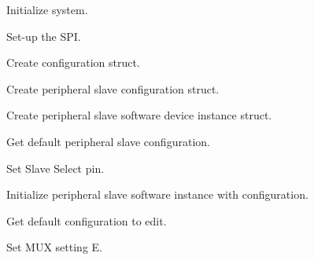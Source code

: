 \begin{DoxyEnumerate}
\item Initialize system. 
\begin{DoxyCodeInclude}{0}
\end{DoxyCodeInclude}

\item Set-\/up the S\+PI. 
\begin{DoxyCodeInclude}{0}
\end{DoxyCodeInclude}

\begin{DoxyEnumerate}
\item Create configuration struct. 
\begin{DoxyCodeInclude}{0}
\end{DoxyCodeInclude}

\item Create peripheral slave configuration struct. 
\begin{DoxyCodeInclude}{0}
\end{DoxyCodeInclude}

\item Create peripheral slave software device instance struct. 
\begin{DoxyCodeInclude}{0}
\end{DoxyCodeInclude}

\item Get default peripheral slave configuration. 
\begin{DoxyCodeInclude}{0}
\end{DoxyCodeInclude}

\item Set Slave Select pin. 
\begin{DoxyCodeInclude}{0}
\end{DoxyCodeInclude}

\item Initialize peripheral slave software instance with configuration. 
\begin{DoxyCodeInclude}{0}
\end{DoxyCodeInclude}

\item Get default configuration to edit. 
\begin{DoxyCodeInclude}{0}
\end{DoxyCodeInclude}

\item Set M\+UX setting E. 
\begin{DoxyCodeInclude}{0}
\end{DoxyCodeInclude}


\end{DoxyEnumerate}
\end{DoxyEnumerate}
